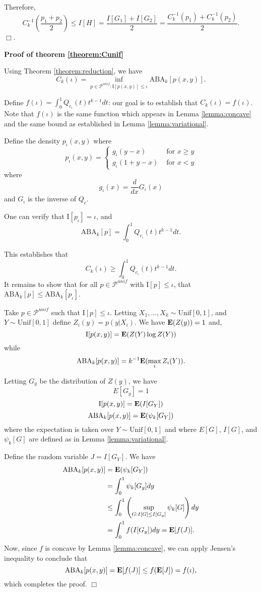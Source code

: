 \documentclass[12pt]{article}
\begin{document}
Therefore,
\[
C^{-1}_k\left(\frac{p_1 + p_2}{2}\right) \leq I[H] = \frac{I[G_1] + I[G_2]}{2} = \frac{C^{-1}_k(p_1) + C^{-1}_k(p_2)}{2}.
\]
$\Box$.


\textbf{Proof of theorem \ref{theorem:Cunif}}

Using Theorem \ref{theorem:reduction}, we have
\[
C_k(\iota) = \inf_{p \in \mathcal{P}^{unif}: \text{I}[p(x,y)] \leq \iota} \text{ABA}_k[p(x,y)].
\]

Define $f(\iota) = \int_0^1 Q_{c_\iota}(t) t^{k-1} dt$: our goal is to
establish that $C_k(\iota) = f(\iota)$.  
Note that $f(\iota)$
is the same function which appears in Lemma \ref{lemma:concave} and
the same bound as established in Lemma \ref{lemma:variational}.

Define the density $p_\iota(x, y)$ where
\[
p_\iota(x, y) = \begin{cases}
g_\iota(y - x) & \text{ for } x\geq y\\
g_\iota(1 + y - x) & \text{ for } x < y
\end{cases}
\]
where
\[
g_\iota(x) = \frac{d}{dx}G_\iota(x)
\]
and $G_\iota$ is the inverse of $Q_c$.

One can verify that $\text{I}[p_\iota] = \iota$, and 
\[
\text{ABA}_k[p] = \int_0^1 Q_{c_\iota}(t) t^{k-1} dt.
\]

This establishes that
\[
C_k(\iota) \geq \int_0^1 Q_{c_\iota}(t) t^{k-1} dt.
\]
It remains to show that for all $p \in \mathcal{P}^{unif}$ with
$\text{I}[p] \leq \iota$, that $\text{ABA}_k[p] \leq \text{ABA}_k[p_\iota]$.

Take $p \in \mathcal{P}^{unif}$ such that $\text{I}[p] \leq \iota$.
Letting $X_1,...,X_k \sim \text{Unif}[0,1]$, and $Y \sim \text{Unif}[0,1]$ define $Z_i(y) = p(y|X_i)$.
We have $\textbf{E}(Z(y)) = 1$ and,
\[
\text{I}[p(x,y)] = \textbf{E}(Z(Y) \log Z(Y))
\]
while
\[
\text{ABA}_k[p(x,y)] = k^{-1}\textbf{E}(\max_i Z_i(Y)).
\]

Letting $G_y$ be the distribution of $Z(y)$, we have
\[
E[G_y] = 1
\]
\[
\text{I}[p(x,y)] = \textbf{E}(I[G_Y])
\]
\[
\text{ABA}_k[p(x,y)] = \textbf{E}(\psi_k[G_Y])
\]
where the expectation is taken over $Y \sim \text{Unif}[0,1]$ and
where $E[G]$, $I[G]$, and $\psi_k[G]$ are defined as in
Lemma \ref{lemma:variational}.

Define the random variable $J = I[G_Y]$.
We have
\begin{align*}
\text{ABA}_k[p(x,y)] &= \textbf{E}(\psi_k[G_Y])
\\&= \int_0^1 \psi_k[G_y] dy
\\&\leq \int_0^1 \left(\sup_{G: I[G] \leq I[G_y]} \psi_k[G]\right) dy
\\&= \int_0^1 f(I[G_y]) dy = \textbf{E}[f(J)].
\end{align*}
Now, since $f$ is concave by Lemma \ref{lemma:concave},
we can apply Jensen's inequality to conclude that
\[
\text{ABA}_k[p(x,y)] = \textbf{E}[f(J)] \leq f(\textbf{E}[J]) = f(\iota),
\]
which completes the proof. $\Box$
\end{document}
